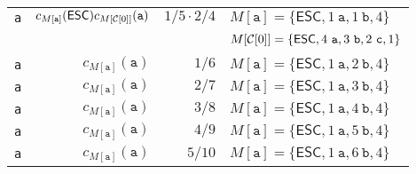 \begin{tabular}{crrl}
    {\tt a} & $c_{M[\mathtt{a}]}(\mathsf{ESC})c_{M[{\cal C}[0]]}(\mathtt a)$ & $1/5\cdot 2/4$ & $M[\mathtt{a}]=\{\mathsf{ESC},1~\mathtt{a},1~\mathtt{b},4\}$\\
    ~       & & & $M[{\cal C}[0]]=\{\mathsf{ESC},4~\mathtt{a},3~\mathtt{b},2~\mathtt{c},1\}$\\
    {\tt a} & $c_{M[\mathtt{a}]}(\mathtt a)$ & $1/6$ & $M[\mathtt{a}]=\{\mathsf{ESC},1~\mathtt{a},2~\mathtt{b},4\}$\\
    {\tt a} & $c_{M[\mathtt{a}]}(\mathtt a)$ & $2/7$ & $M[\mathtt{a}]=\{\mathsf{ESC},1~\mathtt{a},3~\mathtt{b},4\}$\\
    {\tt a} & $c_{M[\mathtt{a}]}(\mathtt a)$ & $3/8$ & $M[\mathtt{a}]=\{\mathsf{ESC},1~\mathtt{a},4~\mathtt{b},4\}$\\
    {\tt a} & $c_{M[\mathtt{a}]}(\mathtt a)$ & $4/9$ & $M[\mathtt{a}]=\{\mathsf{ESC},1~\mathtt{a},5~\mathtt{b},4\}$\\
    {\tt a} & $c_{M[\mathtt{a}]}(\mathtt a)$ & $5/10$ & $M[\mathtt{a}]=\{\mathsf{ESC},1~\mathtt{a},6~\mathtt{b},4\}$
  \end{tabular}
